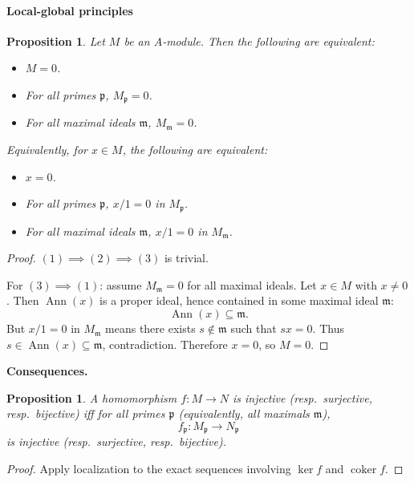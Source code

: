\documentclass[11pt,a4paper]{article}
\theoremstyle{definition}
\theoremstyle{plain}
\newtheorem{proposition}[definition]{Proposition}
\theoremstyle{remark}
\newcommand{\coker}{\operatorname{coker}}
\newcommand{\Ann}{\operatorname{Ann}}
\begin{document}
\paragraph{Local-global principles}

\begin{proposition}
    Let $M$ be an $A$-module. Then the following are equivalent:
    \begin{itemize}
        \item $M=0$.
        \item For all primes $\mathfrak p$, $M_{\mathfrak p}=0$.
        \item For all maximal ideals $\mathfrak m$, $M_{\mathfrak m}=0$.
    \end{itemize}

    Equivalently, for $x\in M$, the following are equivalent:
    \begin{itemize}
        \item $x=0$.
        \item For all primes $\mathfrak p$, $x/1=0$ in $M_{\mathfrak p}$.
        \item For all maximal ideals $\mathfrak m$, $x/1=0$ in $M_{\mathfrak m}$.
    \end{itemize}
\end{proposition}

\begin{proof}
    $(1)\implies(2)\implies(3)$ is trivial.

    For $(3)\implies(1)$: assume $M_{\mathfrak m}=0$ for all maximal ideals.
    Let $x\in M$ with $x\neq 0$. Then $\Ann(x)$ is a proper ideal, hence contained in some maximal ideal $\mathfrak m$:
    \[
    \Ann(x)\subseteq\mathfrak m.
    \]
    But $x/1=0$ in $M_{\mathfrak m}$ means there exists $s\notin\mathfrak m$ such that $sx=0$.
    Thus $s\in\Ann(x)\subseteq\mathfrak m$, contradiction.
    Therefore $x=0$, so $M=0$.
\end{proof}

\textbf{Consequences.}

\begin{proposition}
    A homomorphism $f:M\to N$ is injective (resp.\ surjective, resp.\ bijective) iff
    for all primes $\mathfrak p$ (equivalently, all maximals $\mathfrak m$),
    \[
    f_{\mathfrak p}:M_{\mathfrak p}\to N_{\mathfrak p}
    \]
    is injective (resp.\ surjective, resp.\ bijective).
\end{proposition}

\begin{proof}
    Apply localization to the exact sequences involving $\ker f$ and $\coker f$.
\end{proof}
\end{document}
